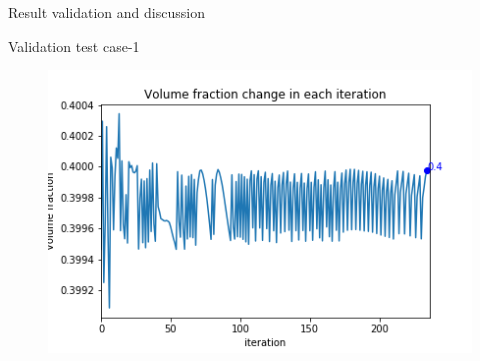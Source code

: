 \documentclass[a4paper,12pt,times]{article}
\begin{document}
\begin{section}{Result validation and discussion}
\begin{subsection}{Validation test case-1}
\begin{figure}[H]
\begin{minipage}{.5\textwidth}
		\label{VC-02.5}
	\end{minipage}%
	\begin{minipage}{.5\textwidth}
		\centering
		\includegraphics[width=1\linewidth]{OC_01_Volume_fractionVSiteration.png}
		\label{VC-02.6}
	\end{minipage}
\end{figure} 


\end{subsection}
\end{section}
\end{document}
